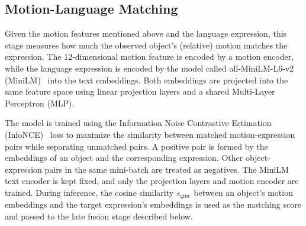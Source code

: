 \documentclass{article}
\providecommand{\DIFaddend}{} %
\DeclareRobustCommand{\DIFaddend}{\DIFOaddend \let\includegraphics\DIFOincludegraphics} %
\begin{document}
\DIFaddend \subsection{Motion-Language Matching}
\label{sec:align}
Given the motion features mentioned above and the language expression, this stage measures how much the observed object's (relative) motion matches the expression. The 12-dimensional motion feature is encoded by a motion encoder, while the language expression is encoded by the model called all-MiniLM-L6-v2 (MiniLM)~\cite{sbert} into the text embeddings. Both embeddings are projected into the same feature space using linear projection layers and a shared Multi-Layer Perceptron (MLP).

The model is trained using the Information Noise Contrastive Estimation (InfoNCE)~\cite{infonce} loss to maximize the similarity between matched motion-expression pairs while separating unmatched pairs. A positive pair is formed by the embeddings of an object and the corresponding expression. Other object-expression pairs in the same mini-batch are treated as negatives. The MiniLM text encoder is kept fixed, and only the projection layers and motion encoder are trained. During inference, the cosine similarity $s_{\mathrm{gmc}}$ between an object's motion embeddings and the target expression's embeddings is used as the matching score and passed to the late fusion stage described below.
\end{document}
